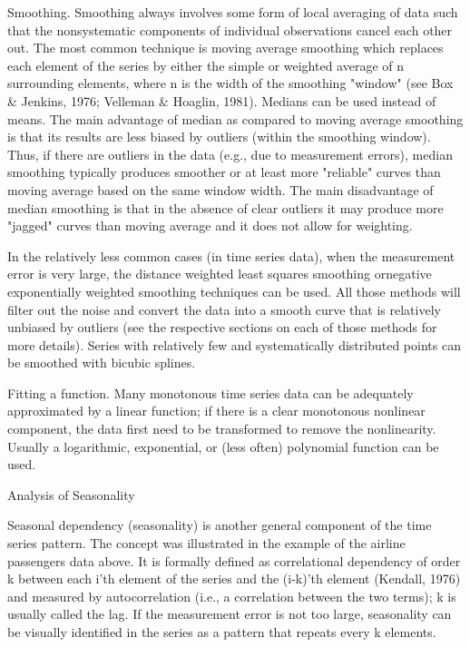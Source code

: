 Smoothing. Smoothing always involves some form of local averaging of data such that the nonsystematic components of individual observations cancel each other out. The most common technique is moving average smoothing which replaces each element of the series by either the simple or weighted average of n surrounding elements, where n is the width of the smoothing "window" (see Box & Jenkins, 1976; Velleman & Hoaglin, 1981). Medians can be used instead of means. The main advantage of median as compared to moving average smoothing is that its results are less biased by outliers (within the smoothing window). Thus, if there are outliers in the data (e.g., due to measurement errors), median smoothing typically produces smoother or at least more "reliable" curves than moving average based on the same window width. The main disadvantage of median smoothing is that in the absence of clear outliers it may produce more "jagged" curves than moving average and it does not allow for weighting.

In the relatively less common cases (in time series data), when the measurement error is very large, the distance weighted least squares smoothing ornegative exponentially weighted smoothing techniques can be used. All those methods will filter out the noise and convert the data into a smooth curve that is relatively unbiased by outliers (see the respective sections on each of those methods for more details). Series with relatively few and systematically distributed points can be smoothed with bicubic splines.

Fitting a function. Many monotonous time series data can be adequately approximated by a linear function; if there is a clear monotonous nonlinear component, the data first need to be transformed to remove the nonlinearity. Usually a logarithmic, exponential, or (less often) polynomial function can be used.

Analysis of Seasonality

Seasonal dependency (seasonality) is another general component of the time series pattern. The concept was illustrated in the example of the airline passengers data above. It is formally defined as correlational dependency of order k between each i'th element of the series and the (i-k)'th element (Kendall, 1976) and measured by autocorrelation (i.e., a correlation between the two terms); k is usually called the lag. If the measurement error is not too large, seasonality can be visually identified in the series as a pattern that repeats every k elements.


